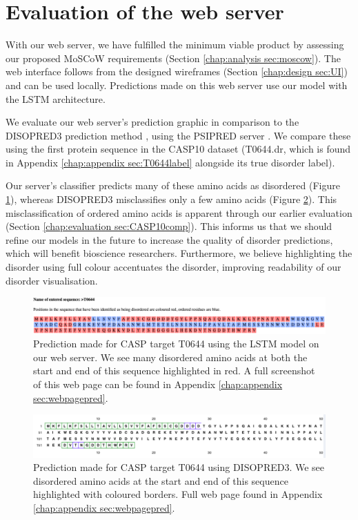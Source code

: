 \documentclass{l4proj}
\begin{document}
\section{Evaluation of the web server}
With our web server, we have fulfilled the minimum viable product by assessing our proposed MoSCoW requirements (Section \ref{chap:analysis sec:moscow}). The web interface follows from the designed wireframes (Section \ref{chap:design sec:UI}) and can be used locally. Predictions made on this web server use our model with the LSTM architecture.

We evaluate our web server’s prediction graphic in comparison to the DISOPRED3 prediction method \citep{Jones:15}, using the PSIPRED server \citep{Jones:19}. We compare these using the first protein sequence in the CASP10 dataset (T0644.dr, which is found in Appendix \ref{chap:appendix sec:T0644label} alongside its true disorder label).

Our server’s classifier predicts many of these amino acids as disordered (Figure \ref{fig:mypredclipped}), whereas DISOPRED3 misclassifies only a few amino acids (Figure \ref{fig:disopredclipped}). This misclassification of ordered amino acids is apparent through our earlier evaluation (Section \ref{chap:evaluation sec:CASP10comp}). This informs us that we should refine our models in the future to increase the quality of disorder predictions, which will benefit bioscience researchers. Furthermore, we believe highlighting the disorder using full colour accentuates the disorder, improving readability of our disorder visualisation. 
\begin{figure}[!htb]
    \centering
    \includegraphics[width=\linewidth]{images/web_eval/mypred-clipped.pdf}
    
    \caption{Prediction made for CASP target T0644 using the LSTM model on our web server. We see many disordered amino acids at both the start and end of this sequence highlighted in red. A full screenshot of this web page can be found in Appendix \ref{chap:appendix sec:webpagepred}.}
    
    \label{fig:mypredclipped}
\end{figure}
\begin{figure}[!htb]
    \centering
    \includegraphics[width=\linewidth]{images/web_eval/disopred-clipped.pdf}
    
    \caption{Prediction made for CASP target T0644 using DISOPRED3. We see disordered amino acids at the start and end of this sequence highlighted with coloured borders. Full web page found in Appendix \ref{chap:appendix sec:webpagepred}.}
    
    \label{fig:disopredclipped}
\end{figure}
\end{document}
